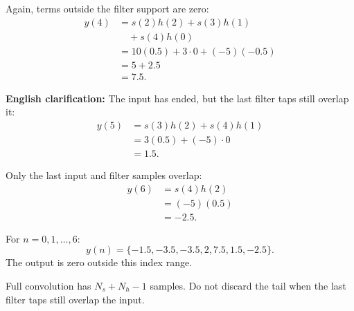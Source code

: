 {
Again, terms outside the filter support are zero:
\[
\begin{aligned}
y(4)&=s(2)h(2)+s(3)h(1)\\
    &\quad+s(4)h(0)\\
    &=10(0.5)+3\cdot0+(-5)(-0.5)\\
    &=5+2.5\\
    &=7.5.
\end{aligned}
\]

\textbf{English clarification:} The input has ended, but the last filter taps
still overlap it:
\[
\begin{aligned}
y(5)&=s(3)h(2)+s(4)h(1)\\
    &=3(0.5)+(-5)\cdot0\\
    &=1.5.
\end{aligned}
\]

Only the last input and filter samples overlap:
\[
\begin{aligned}
y(6)&=s(4)h(2)\\
    &=(-5)(0.5)\\
    &=-2.5.
\end{aligned}
\]

For $n=0,1,\ldots,6$:
\[
\boxed{y(n)=\{-1.5,-3.5,-3.5,2,7.5,1.5,-2.5\}}.
\]
The output is zero outside this index range.

Full convolution has $N_s+N_h-1$ samples.
Do not discard the tail when the last filter taps still overlap the input.
}

